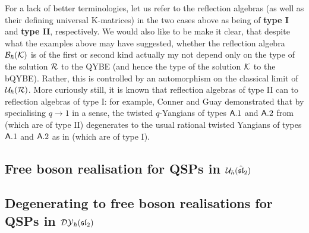         For a lack of better terminologies, let us refer to the reflection algebras (as well as their defining universal K-matrices) in the two cases above as being of \textbf{type I} and \textbf{type II}, respectively. We would also like to be make it clear, that despite what the examples above may have suggested, whether the reflection algebra $\mathcal{B}_{\hbar}(\mathcal{K})$ is of the first or second kind actually my not depend only on the type of the solution $\mathcal{R}$ to the QYBE (and hence the type of the solution $\mathcal{K}$ to the bQYBE). Rather, this is controlled by an automorphism on the classical limit of $\mathcal{U}_{\hbar}(\mathcal{R})$. More curiously still, it is known that reflection algebras of type II can  to reflection algebras of type I: for example, Conner and Guay demonstrated that by specialising $q \to 1$ in a sense, the twisted $q$-Yangians of types $\mathsf{A}.1$ and $\mathsf{A}.2$ from \cite{molev_ragoucy_sorba_twisted_q_yangians_type_A} (which are of type II) degenerates to the usual rational twisted Yangians of types $\mathsf{A}.1$ and $\mathsf{A}.2$ as in \cite[Chapter 2]{molev_yangians_and_classical_lie_algebras} (which are of type I).

    \subsection{\texorpdfstring{Free boson realisation for QSPs in $\mathcal{U}_{\hbar}(\hat{\mathfrak{sl}}_2)$}{}}

    \subsection{\texorpdfstring{Degenerating to free boson realisations for QSPs in $\mathcal{DY}_{\hbar}(\mathfrak{sl}_2)$}{}}